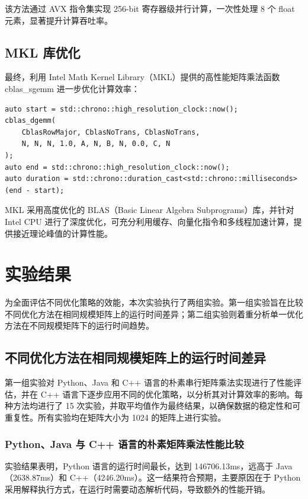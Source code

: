 \documentclass[a4paper, utf8]{ctexart}
\begin{document}
	该方法通过 AVX 指令集实现 256-bit 寄存器级并行计算，一次性处理 8 个 float 元素，显著提升计算吞吐率。
	
	\subsection{MKL 库优化}
	
	最终，利用 Intel Math Kernel Library（MKL）提供的高性能矩阵乘法函数 cblas\_sgemm 进一步优化计算效率：
	
	\begin{verbatim}
auto start = std::chrono::high_resolution_clock::now();
cblas_dgemm(
    CblasRowMajor, CblasNoTrans, CblasNoTrans,
    N, N, N, 1.0, A, N, B, N, 0.0, C, N
);
auto end = std::chrono::high_resolution_clock::now();
auto duration = std::chrono::duration_cast<std::chrono::milliseconds>(end - start);
	\end{verbatim}
	
	MKL 采用高度优化的 BLAS（Basic Linear Algebra Subprograms）库，并针对 Intel CPU 进行了深度优化，可充分利用缓存、向量化指令和多线程加速计算，提供接近理论峰值的计算性能。
	
	\section{实验结果}
	
	为全面评估不同优化策略的效能，本次实验执行了两组实验。第一组实验旨在比较不同优化方法在相同规模矩阵上的运行时间差异；第二组实验则着重分析单一优化方法在不同规模矩阵下的运行时间趋势。
	
	\subsection{不同优化方法在相同规模矩阵上的运行时间差异}
	
	第一组实验对 Python、Java 和 C++ 语言的朴素串行矩阵乘法实现进行了性能评估，并在 C++ 语言下逐步应用不同的优化策略，以分析其对计算效率的影响。每种方法均进行了 15 次实验，并取平均值作为最终结果，以确保数据的稳定性和可重复性。所有实验均在矩阵大小为 1024 的矩阵上进行实验。
	
	\subsubsection{Python、Java 与 C++ 语言的朴素矩阵乘法性能比较}
	
	实验结果表明，Python 语言的运行时间最长，达到 146706.13ms，远高于 Java（2638.87ms）和 C++（4246.20ms）。这一结果符合预期，主要原因在于 Python 采用解释执行方式，在运行时需要动态解析代码，导致额外的性能开销。
	
\end{document}
